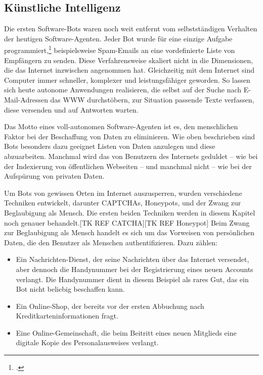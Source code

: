 \subsection{Künstliche Intelligenz}
\label{sub:kunstliche_intelligenz}

Die ersten Software-Bots waren noch weit entfernt vom selbstständigen Verhalten
der heutigen Software-Agenten. Jeder Bot wurde für eine einzige Aufgabe
programmiert,\footcite{wa:spamFilter} beispielsweise Spam-Emails an eine
vordefinierte Liste von Empfängern zu senden. Diese Verfahrensweise skaliert
nicht in die Dimensionen, die das Internet inzwischen angenommen hat.
Gleichzeitig mit dem Internet sind Computer immer schneller, komplexer und
leistungsfähiger geworden. So lassen sich heute autonome Anwendungen
realisieren, die selbst auf der Suche nach E-Mail-Adressen das WWW
durchstöbern, zur Situation passende Texte verfassen, diese versenden und auf
Antworten warten.

Das Motto eines voll-autonomen Software-Agenten ist es, den menschlichen Faktor
bei der Beschaffung von Daten zu eliminieren. Wie oben beschrieben sind Bots
besonders dazu geeignet Listen von Daten anzulegen und diese abzuarbeiten.
Manchmal wird das von Benutzern des Internets geduldet -- wie bei der
Indexierung von öffentlichen Webseiten -- und manchmal nicht -- wie bei der
Aufspürung von privaten Daten.

Um Bots von gewissen Orten im Internet auszusperren, wurden verschiedene
Techniken entwickelt, darunter CAPTCHAs, Honeypots, und der Zwang zur
Beglaubigung als Mensch. Die ersten beiden Techniken werden in diesem Kapitel
noch genauer behandelt.{[}TK REF CATCHA{]}{[}TK REF Honeypot{]} Beim Zwang zur
Beglaubigung als Mensch handelt es sich um das Vorweisen von persönlichen
Daten, die den Benutzer als Menschen authentifizieren. Dazu zählen:

\begin{itemize}
\item
  Ein Nachrichten-Dienst, der seine Nachrichten über das Internet versendet,
  aber dennoch die Handynummer bei der Registrierung eines neuen Accounts
  verlangt. Die Handynummer dient in diesem Beispiel als rares Gut, das ein Bot
  nicht beliebig beschaffen kann.
\item
  Ein Online-Shop, der bereits vor der ersten Abbuchung nach
  Kreditkarteninformationen fragt.
\item
  Eine Online-Gemeinschaft, die beim Beitritt eines neuen Mitglieds eine
  digitale Kopie des Personalausweises verlangt.
\end{itemize}

